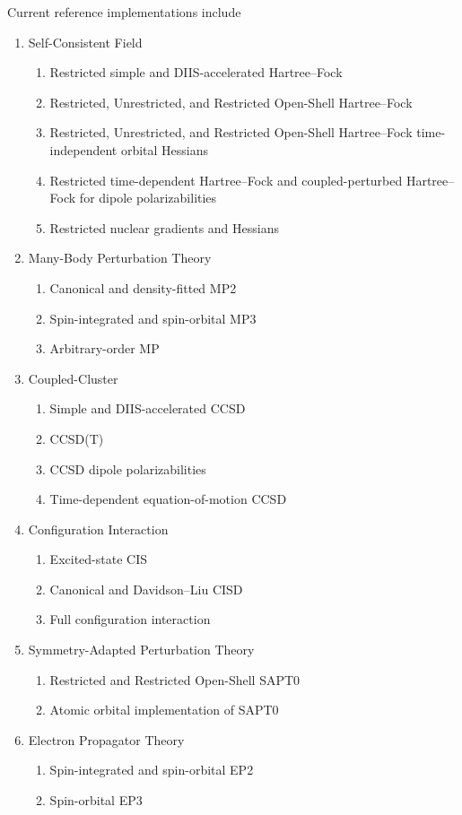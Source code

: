 \documentclass[%
  class = book,%
  crop = false,%
  float = true,%
  multi = true,%
  preview = false,%
]{standalone}
\let\cite\autocite
\begin{document}
Current reference implementations include
\begin{enumerate}
\item Self-Consistent Field
   \begin{enumerate}
   \item Restricted simple and DIIS\cite{25}-accelerated Hartree--Fock
   \item Restricted, Unrestricted, and Restricted Open-Shell Hartree--Fock
   \item Restricted, Unrestricted, and Restricted Open-Shell Hartree--Fock time-independent orbital Hessians
   \item Restricted time-dependent Hartree--Fock and coupled-perturbed Hartree--Fock for dipole polarizabilities
   \item Restricted nuclear gradients and Hessians
   \end{enumerate}

\item Many-Body Perturbation Theory
    \begin{enumerate}
    \item Canonical and density-fitted MP2
    \item Spin-integrated and spin-orbital MP3
    \item Arbitrary-order MP
    \end{enumerate}

\item Coupled-Cluster
    \begin{enumerate}
    \item Simple and DIIS-accelerated CCSD
    \item CCSD(T)
    \item CCSD dipole polarizabilities
    \item Time-dependent equation-of-motion CCSD
    \end{enumerate}

\item Configuration Interaction
    \begin{enumerate}
    \item Excited-state CIS
    \item Canonical and Davidson--Liu CISD
    \item Full configuration interaction
    \end{enumerate}

\item Symmetry-Adapted Perturbation Theory
    \begin{enumerate}
    \item Restricted and Restricted Open-Shell SAPT0
    \item Atomic orbital implementation of SAPT0
    \end{enumerate}

\item Electron Propagator Theory
    \begin{enumerate}
    \item Spin-integrated and spin-orbital EP2
    \item Spin-orbital EP3
    \end{enumerate}

\end{enumerate}
\end{document}
